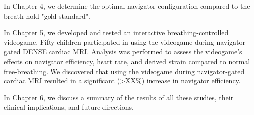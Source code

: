 	\indent In Chapter 4, we determine the optimal navigator configuration compared to the breath-hold "gold-standard".
	
	\indent In Chapter 5, we developed and tested an interactive breathing-controlled videogame. Fifty children participated in using the videogame during navigator-gated DENSE cardiac MRI. Analysis was performed to assess the videogame's effects on navigator efficiency, heart rate, and derived strain compared to normal free-breathing. We discovered that using the videogame during navigator-gated cardiac MRI resulted in a significant (>XX\%) increase in navigator efficiency.
	
	\indent In Chapter 6, we discuss a summary of the results of all these studies, their clinical implications, and future directions.


